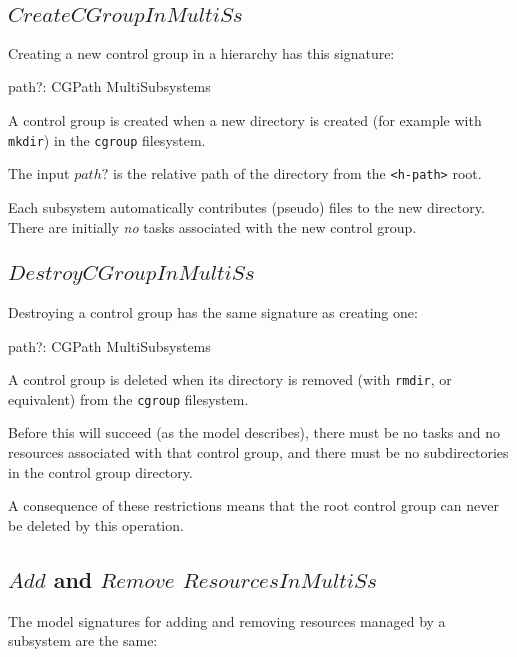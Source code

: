 \documentclass[a4paper,twoside,12pt]{article}
\begin{document}
\subsection{$CreateCGroupInMultiSs$}

Creating a new control group in a hierarchy has this signature:
\begin{schema*}
    path?: CGPath
\also 
    \Delta MultiSubsystems
\end{schema*}
A control group is created when a new directory is created (for example with \texttt{mkdir}) 
in the \texttt{cgroup} filesystem.

The input $path?$ is the relative path of the directory from the \texttt{<h-path>} root.

Each subsystem automatically contributes
(pseudo) files to the new directory. There are initially \emph{no} tasks associated with the new control group.

\subsection{$DestroyCGroupInMultiSs$}

Destroying a control group has the same signature as creating one:
\begin{schema*}
    path?: CGPath
\also 
    \Delta MultiSubsystems
\end{schema*}
A control group is deleted when its directory is removed (with \texttt{rmdir}, or equivalent) from the 
\texttt{cgroup} filesystem.

Before this will succeed (as the model describes), there must be no tasks and no resources 
associated with that control group,
and there must be no subdirectories in the control group directory.

A consequence of these restrictions means that the root control group can never be deleted by this operation.

\subsection{$Add$ and $Remove$ $ResourcesInMultiSs$}

The model signatures for adding and removing resources managed by a subsystem are the same:
\end{document}
